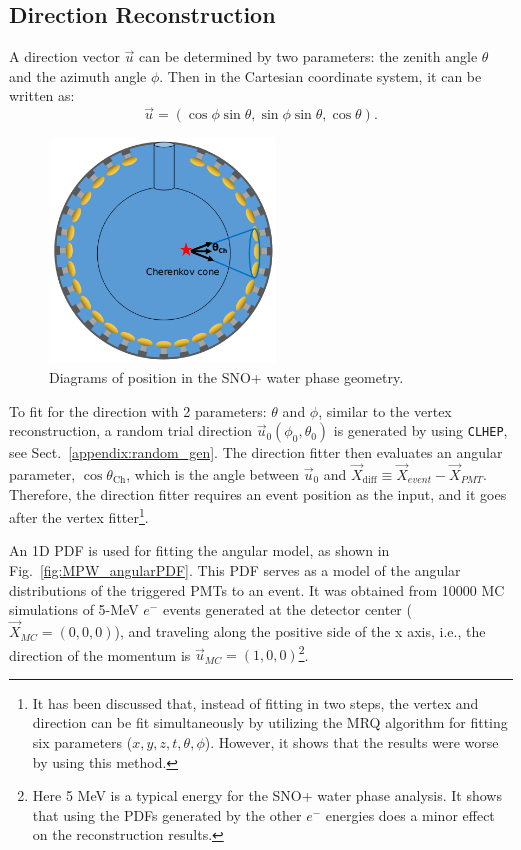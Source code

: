 \subsection{Direction Reconstruction}\label{sect:waterDirection}
A direction vector $\vec{u}$ can be determined by two parameters: the zenith angle $\theta$ and the azimuth angle $\phi$. Then in the Cartesian coordinate system, it can be written as: 
\begin{equation}
\vec{u}=(\cos\phi\sin\theta,\sin\phi\sin\theta,\cos\theta).
\end{equation}

\begin{figure}[htbp]
	\centering
	\includegraphics[width=6cm]{mpwDiagram2.png}
	\caption{Diagrams of position in the SNO+ water phase geometry.}
	\label{mpwdiagram_direction}
\end{figure}
To fit for the direction with 2 parameters: $\theta$ and $\phi$, similar to the vertex reconstruction, a random trial direction $\vec{u}_0(\phi_0,\theta_0)$ is generated by using \texttt{CLHEP}, see Sect.~\ref{appendix:random_gen}. The direction fitter then evaluates an angular parameter, $\cos\theta_{\mathrm{Ch}}$, which is the angle between $\vec{u}_{0}$ and $\vec{X}_{{\mathrm{diff}}}\equiv \vec{X}_{event}-\vec{X}_{PMT}$. Therefore, the direction fitter requires an event position as the input, and it goes after the vertex fitter\footnote{It has been discussed that, instead of fitting in two steps, the vertex and direction can be fit simultaneously by utilizing the MRQ algorithm for fitting six parameters ($x,y,z,t,\theta,\phi$). However, it shows that the results were worse by using this method.}.

An 1D PDF is used for fitting the angular model, as shown in Fig.~\ref{fig:MPW_angularPDF}. This PDF serves as a model of the angular distributions of the triggered PMTs to an event. It was obtained from 10000 MC simulations of 5-MeV $e^-$ events generated at the detector center ($\vec{X}_{MC}=(0,0,0)$), and traveling along the positive side of the x axis, i.e., the direction of the momentum is $\vec{u}_{MC}=(1,0,0)$\footnote{Here 5 MeV is a typical energy for the SNO+ water phase analysis. It shows that using the PDFs generated by the other $e^-$ energies does a minor effect on the reconstruction results.}.

